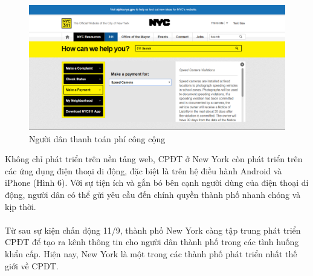\documentclass[a4paper]{article}
\begin{document}
\newpage
\begin{center}
    \begin{figure}[h]
    \begin{center}
     \includegraphics[scale=.4]{newyork_payment.PNG}
    \end{center}
    \caption{Người dân thanh toán phí công cộng}
    \label{refhinh2}
    \end{figure}
\end{center}
Không chỉ phát triển trên nền tảng web, CPĐT ở New York còn phát triển trên các ứng dụng điện thoại di động, đặc biệt là trên hệ điều hành Android và iPhone (Hình 6). Với sự tiện ích và gắn bó bên cạnh người dùng của điện thoại di động, người dân có thể gửi yêu cầu đến chính quyền thành phố nhanh chóng và kịp thời.\\
\\
Từ sau sự kiện chấn động 11/9, thành phố New York càng tập trung phát triển CPĐT để tạo ra kênh thông tin cho người dân thành phố trong các tình huống khẩn cấp. Hiện nay, New York là một trong các thành phố phát triển nhất thế giới về CPĐT.
\end{document}
